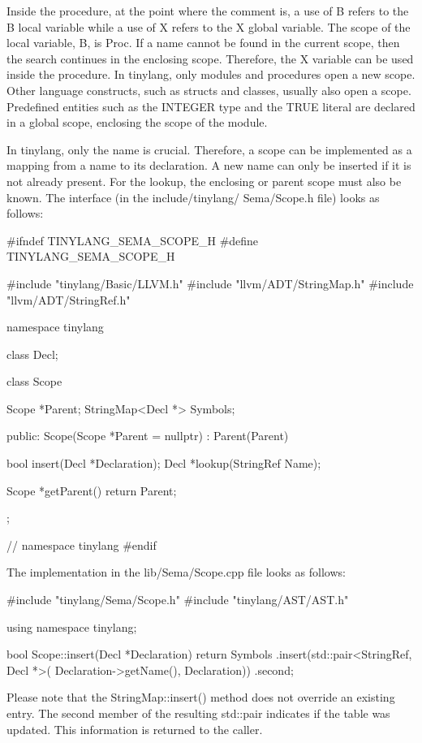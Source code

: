 Inside the procedure, at the point where the comment is, a use of B refers to the B local variable while a use of X refers to the X global variable. The scope of the local variable, B, is Proc. If a name cannot be found in the current scope, then the search continues in the enclosing scope. Therefore, the X variable can be used inside the procedure. In tinylang, only modules and procedures open a new scope. Other language constructs, such as structs and classes, usually also open a scope. Predefined entities such as the INTEGER type and the TRUE literal are declared in a global scope, enclosing the scope of the module.

In tinylang, only the name is crucial. Therefore, a scope can be implemented as a mapping from a name to its declaration. A new name can only be inserted if it is not already present. For the lookup, the enclosing or parent scope must also be known. The interface (in the include/tinylang/ Sema/Scope.h file) looks as follows:

\begin{cpp}
#ifndef TINYLANG_SEMA_SCOPE_H
#define TINYLANG_SEMA_SCOPE_H

#include "tinylang/Basic/LLVM.h"
#include "llvm/ADT/StringMap.h"
#include "llvm/ADT/StringRef.h"

namespace tinylang {

class Decl;

class Scope {
    Scope *Parent;
    StringMap<Decl *> Symbols;

    public:
    Scope(Scope *Parent = nullptr) : Parent(Parent) {}

    bool insert(Decl *Declaration);
    Decl *lookup(StringRef Name);

    Scope *getParent() { return Parent; }
};
} // namespace tinylang
#endif
\end{cpp}

The implementation in the lib/Sema/Scope.cpp file looks as follows:

\begin{cpp}
#include "tinylang/Sema/Scope.h"
#include "tinylang/AST/AST.h"

using namespace tinylang;

bool Scope::insert(Decl *Declaration) {
    return Symbols
        .insert(std::pair<StringRef, Decl *>(
            Declaration->getName(), Declaration))
        .second;
}
\end{cpp}

Please note that the StringMap::insert() method does not override an existing entry. The second member of the resulting std::pair indicates if the table was updated. This information is returned to the caller.

